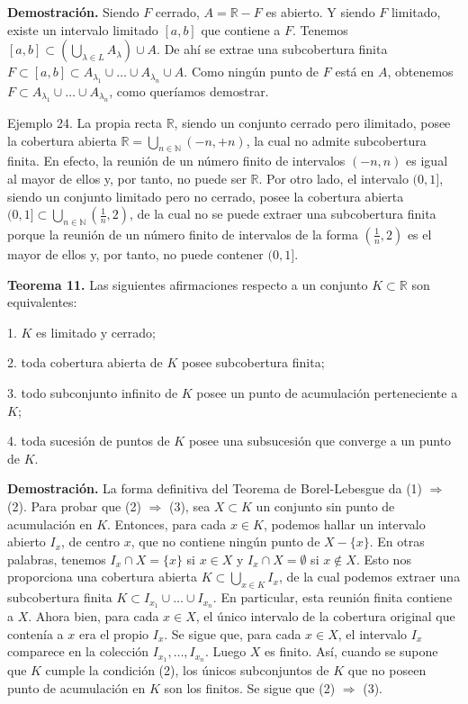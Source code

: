 \documentclass[12pt,oneside]{book}
\begin{document}
\textbf{Demostración.} Siendo \(F\) cerrado, \(A = \mathbb{R} - F\) es abierto. Y siendo \(F\) limitado, existe un intervalo limitado \([a, b]\) que contiene a \(F\). Tenemos \([a, b] \subset \left(\bigcup_{\lambda \in L} A_\lambda\right) \cup A\). De ahí se extrae una subcobertura finita \(F \subset [a, b] \subset A_{\lambda_1} \cup \dots \cup A_{\lambda_n} \cup A\). Como ningún punto de \(F\) está en \(A\), obtenemos \(F \subset A_{\lambda_1} \cup \dots \cup A_{\lambda_n}\), como queríamos demostrar.

Ejemplo 24. La propia recta \(\mathbb{R}\), siendo un conjunto cerrado pero ilimitado, posee la cobertura abierta \(\mathbb{R} = \bigcup_{n \in \mathbb{N}} (-n, +n)\), la cual no admite subcobertura finita. En efecto, la reunión de un número finito de intervalos \((-n, n)\) es igual al mayor de ellos y, por tanto, no puede ser \(\mathbb{R}\). Por otro lado, el intervalo \((0, 1]\), siendo un conjunto limitado pero no cerrado, posee la cobertura abierta \((0, 1] \subset \bigcup_{n \in \mathbb{N}} \left(\frac{1}{n}, 2\right)\), de la cual no se puede extraer una subcobertura finita porque la reunión de un número finito de intervalos de la forma \(\left(\frac{1}{n}, 2\right)\) es el mayor de ellos y, por tanto, no puede contener \((0, 1]\).

\textbf{Teorema 11.} Las siguientes afirmaciones respecto a un conjunto \(K \subset \mathbb{R}\) son equivalentes:

1. \(K\) es limitado y cerrado;

2. toda cobertura abierta de \(K\) posee subcobertura finita;

3. todo subconjunto infinito de \(K\) posee un punto de acumulación perteneciente a \(K\);

4. toda sucesión de puntos de \(K\) posee una subsucesión que converge a un punto de \(K\).

\textbf{Demostración.} La forma definitiva del Teorema de Borel-Lebesgue da (1) \(\Rightarrow\) (2). Para probar que (2) \(\Rightarrow\) (3), sea \(X \subset K\) un conjunto sin punto de acumulación en \(K\). Entonces, para cada \(x \in K\), podemos hallar un intervalo abierto \(I_x\), de centro \(x\), que no contiene ningún punto de \(X - \{x\}\). En otras palabras, tenemos \(I_x \cap X = \{x\}\) si \(x \in X\) y \(I_x \cap X = \emptyset\) si \(x \notin X\). Esto nos proporciona una cobertura abierta \(K \subset \bigcup_{x \in K} I_x\), de la cual podemos extraer una subcobertura finita \(K \subset I_{x_1} \cup \dots \cup I_{x_n}\). En particular, esta reunión finita contiene a \(X\). Ahora bien, para cada \(x \in X\), el único intervalo de la cobertura original que contenía a \(x\) era el propio \(I_x\). Se sigue que, para cada \(x \in X\), el intervalo \(I_x\) comparece en la colección \(I_{x_1}, \dots, I_{x_n}\). Luego \(X\) es finito. Así, cuando se supone que \(K\) cumple la condición (2), los únicos subconjuntos de \(K\) que no poseen punto de acumulación en \(K\) son los finitos. Se sigue que (2) \(\Rightarrow\) (3).
\end{document}
